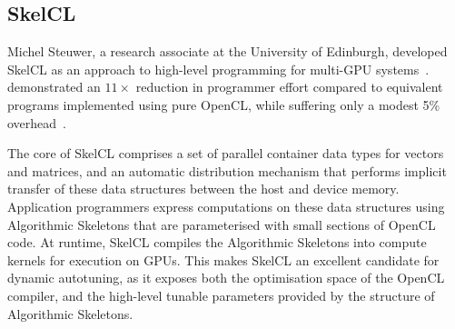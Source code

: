 \subsection{SkelCL}
Michel Steuwer, a research associate at the University of Edinburgh,
developed SkelCL as an approach to high-level programming for
multi-GPU systems~\cite{Steuwer2011,
  Steuwer2013a}. \citeauthor{Steuwer2012} demonstrated an $11\times$
reduction in programmer effort compared to equivalent programs
implemented using pure OpenCL, while suffering only a modest 5\%
overhead~\cite{Steuwer2012}.

The core of SkelCL comprises a set of parallel container data types
for vectors and matrices, and an automatic distribution mechanism that
performs implicit transfer of these data structures between the host
and device memory. Application programmers express computations on
these data structures using Algorithmic Skeletons that are
parameterised with small sections of OpenCL code. At runtime, SkelCL
compiles the Algorithmic Skeletons into compute kernels for execution
on GPUs. This makes SkelCL an excellent candidate for dynamic
autotuning, as it exposes both the optimisation space of the OpenCL
compiler, and the high-level tunable parameters provided by the
structure of Algorithmic Skeletons.
